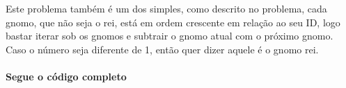 Este problema também é um dos simples, como descrito no problema, cada gnomo, que não seja o rei, está em ordem crescente em relação ao seu ID, logo bastar iterar sob os gnomos e subtrair o gnomo atual com o próximo gnomo. Caso o número seja diferente de 1, então quer dizer aquele é o gnomo rei.
\paragraph{Segue o código completo}
\begin{mdframed}[linewidth=0pt,backgroundcolor=codebgcolor]
    \inputminted[breaklines]{python}{../src/oddgnome/oddgnome.py}
\end{mdframed}